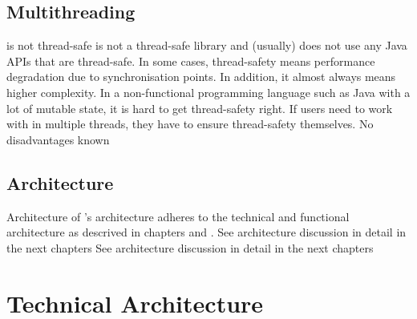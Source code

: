 
\section{Multithreading}
\label{sec:mult}

{%
\LibName{} is not thread-safe
}
{%
\LibName{} is not a thread-safe library and (usually) does not use any Java APIs that are thread-safe.
}
{%
In some cases, thread-safety means performance degradation due to synchronisation points. In addition, it almost always means higher complexity. In a non-functional programming language such as Java with a lot of mutable state, it is hard to get thread-safety right. If users need to work with \LibName{} in multiple threads, they have to ensure thread-safety themselves.
}
{%
No disadvantages known
}


\section{Architecture}
\label{sec:arch}

{%
Architecture of \LibName{}
}
{%
\LibName{}'s architecture adheres to the technical and functional architecture as descrived in chapters  and .
}
{%
See architecture discussion in detail in the next chapters
}
{%
See architecture discussion in detail in the next chapters
}


\chapter{Technical Architecture}
\label{sec:TechnicalArchitectureChap}

